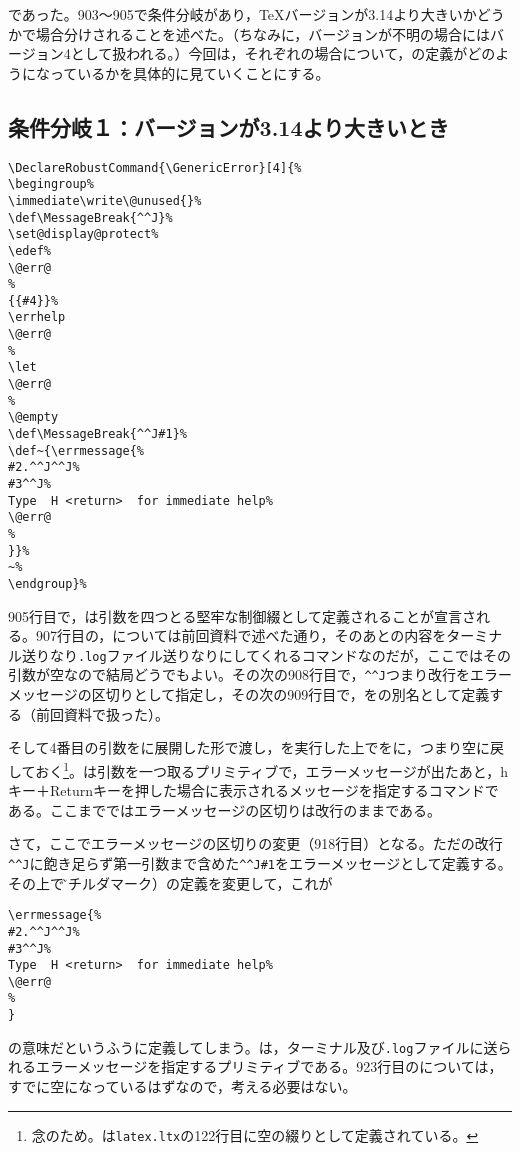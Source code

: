 \documentclass[autodetect-engine,dvipdfmx]{jsarticle}
\begin{document}
であった。903〜905で条件分岐があり，\TeX バージョンが3.14より大きいかどうかで場合分けされることを述べた。（ちなみに，バージョンが不明の場合にはバージョン4として扱われる。）今回は，それぞれの場合について，の定義がどのようになっているかを具体的に見ていくことにする。

\subsection{条件分岐１：バージョンが3.14より大きいとき}

\latexltx
\begin{lstlisting}[firstnumber=905]
\DeclareRobustCommand{\GenericError}[4]{%
\begingroup%
\immediate\write\@unused{}%
\def\MessageBreak{^^J}%
\set@display@protect%
\edef%
\@err@                                                                 %
{{#4}}%
\errhelp
\@err@                                                                 %
\let
\@err@                                                                 %
\@empty
\def\MessageBreak{^^J#1}%
\def~{\errmessage{%
#2.^^J^^J%
#3^^J%
Type  H <return>  for immediate help%
\@err@                                                                 %
}}%
~%
\endgroup}%
\end{lstlisting}

905行目で，は引数を四つとる堅牢な制御綴として定義されることが宣言される。907行目の，については前回資料で述べた通り，そのあとの内容をターミナル送りなり\texttt{.log}ファイル送りなりにしてくれるコマンドなのだが，ここではその引数が空なので結局どうでもよい。その次の908行目で，\preSub\verb|^^J|\preSub つまり改行をエラーメッセージの区切りとして指定し，その次の909行目で，をの別名として定義する（前回資料で扱った）。

そして4番目の引数をに展開した形で渡し，を実行した上でをに，つまり空に戻しておく\footnote{念のため。は\texttt{latex.ltx}の122行目に空の綴りとして定義されている。}。は引数を一つ取るプリミティブで，エラーメッセージが出たあと，hキー＋Returnキーを押した場合に表示されるメッセージを指定するコマンドである。ここまでではエラーメッセージの区切りは改行のままである。

さて，ここでエラーメッセージの区切りの変更（918行目）となる。ただの改行\preSub\verb|^^J|\preSub に飽き足らず第一引数まで含めた\preSub\verb|^^J#1|\preSub をエラーメッセージとして定義する。その上で\~（チルダマーク）の定義を変更して，これが
\texsource
\begin{lstlisting}
\errmessage{%
#2.^^J^^J%
#3^^J%
Type  H <return>  for immediate help%
\@err@                                                                 %
}
\end{lstlisting}
の意味だというふうに定義してしまう。は，ターミナル及び\texttt{.log}ファイルに送られるエラーメッセージを指定するプリミティブである。923行目のについては，すでに空になっているはずなので，考える必要はない。
\end{document}
